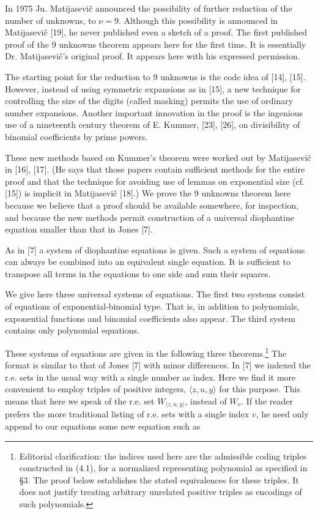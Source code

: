 \documentclass[11pt,a4paper]{article}
\newcommand{\origpage}[1]{\marginnote{\footnotesize\textbf{[#1]}}}
\begin{document}
In 1975 Ju. Matijasevič announced the possibility of further reduction of the number of unknowns, to $\nu=9$. Although this possibility is announced in Matijasevič [19], he never published even a sketch of a proof. The first published proof of the 9 unknowns theorem appears here for the first time. It is \origpage{551}essentially Dr. Matijasevič's original proof. It appears here with his expressed permission.

The starting point for the reduction to 9 unknowns is the code idea of [14], [15]. However, instead of using symmetric expansions as in [15], a new technique for controlling the size of the digits (called masking) permits the use of ordinary number expansions. Another important innovation in the proof is the ingenious use of a nineteenth century theorem of E. Kummer, [23], [26], on divisibility of binomial coefficients by prime powers.

These new methods based on Kummer's theorem were worked out by Matijasevič in [16], [17]. (He says that those papers contain sufficient methods for the entire proof and that the technique for avoiding use of lemmas on exponential size (cf. [15]) is implicit in Matijasevič [18].) We prove the 9 unknowns theorem here because we believe that a proof should be available somewhere, for inspection, and because the new methods permit construction of a universal diophantine equation smaller than that in Jones [7].

As in [7] a system of diophantine equations is given. Such a system of equations can always be combined into an equivalent single equation. It is sufficient to transpose all terms in the equations to one side and sum their squares.

We give here three universal systems of equations. The first two systems consist of equations of exponential-binomial type. That is, in addition to polynomials, exponential functions and binomial coefficients also appear. The third system contains only polynomial equations.

These systems of equations are given in the following three theorems.\footnote{Editorial clarification: the indices used here are the admissible coding triples constructed in (4.1), for a normalized representing polynomial as specified in §3. The proof below establishes the stated equivalences for these triples. It does not justify treating arbitrary unrelated positive triples as encodings of such polynomials.} The format is similar to that of Jones [7] with minor differences. In [7] we indexed the r.e. sets in the usual way with a single number as index. Here we find it more convenient to employ triples of positive integers, $\langle z,\allowbreak  u,\allowbreak  y\rangle$ for this purpose. This means that here we speak of the r.e. set $W_{\langle z, u, y\rangle}$, instead of $W_{v}$. If the reader prefers the more traditional listing of r.e. sets with a single index $v$, he need only append to our equations some new equation such as
\end{document}
